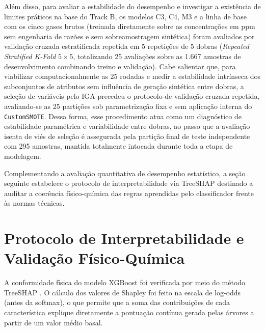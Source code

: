 Além disso, para avaliar a estabilidade do desempenho e investigar a existência de limites práticos na base do Track B, os modelos C3, C4, M3 e a linha de base com os cinco gases brutos (treinada diretamente sobre as concentrações em ppm sem engenharia de razões e sem sobreamostragem sintética) foram avaliados por validação cruzada estratificada repetida em 5 repetições de 5 dobras (\textit{Repeated Stratified K-Fold} $5 \times 5$, totalizando 25 avaliações sobre as 1.667 amostras de desenvolvimento combinando treino e validação). Cabe salientar que, para viabilizar computacionalmente as 25 rodadas e medir a estabilidade intrínseca dos subconjuntos de atributos sem influência de geração sintética entre dobras, a seleção de variáveis pelo IGA precedeu o protocolo de validação cruzada repetida, avaliando-se as 25 partições sob parametrização fixa e sem aplicação interna do \texttt{CustomSMOTE}. Dessa forma, esse procedimento atua como um diagnóstico de estabilidade paramétrica e variabilidade entre dobras, ao passo que a avaliação isenta de viés de seleção é assegurada pela partição final de teste independente com 295 amostras, mantida totalmente intocada durante toda a etapa de modelagem.

Complementando a avaliação quantitativa de desempenho estatístico, a seção seguinte estabelece o protocolo de interpretabilidade via TreeSHAP destinado a auditar a coerência físico-química das regras aprendidas pelo classificador frente às normas técnicas.

\section{Protocolo de Interpretabilidade e Validação Físico-Química}\label{sec:protocolo_interpretabilidade}

A conformidade física do modelo XGBoost foi verificada por meio do método TreeSHAP \cite{lundberg2020}. O cálculo dos valores de Shapley foi feito na escala de log-odds (antes da softmax), o que permite que a soma das contribuições de cada característica explique diretamente a pontuação contínua gerada pelas árvores a partir de um valor médio basal.

